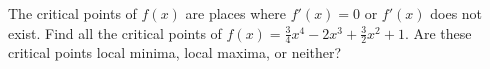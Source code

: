 The critical points of $f(x)$ are places where $f'(x)=0$ or $f'(x)$ does not exist.  Find all the critical points of $f(x)=\frac{3}{4} x^4 - 2 x^3 + \frac{3}{2} x^2 + 1$.  Are these critical points local minima, local maxima, or neither?
